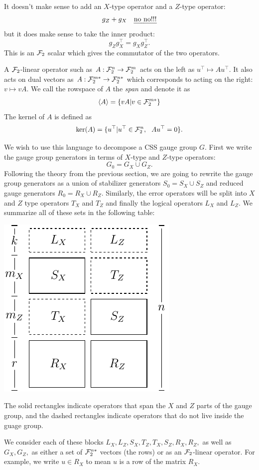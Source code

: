 It doesn't make sense to add an $X$-type operator and
a $Z$-type operator:
$$
    g_Z + g_X \ \ \ \mbox{\emph{no no!!!}}
$$
but it does make sense to take the inner product:
$$
    g_Z g_X^\top = g_X g_Z^\top.
$$
This is an $\mathcal{F}_2$ scalar which gives the commutator of the 
two operators.

A $\mathcal{F}_2$-linear operator such as
$ A : \mathcal{F}_2^n \to \mathcal{F}_2^m $
acts on the left as $ u^\top \mapsto A u^\top.$
It also acts on dual vectors as
$ A : \mathcal{F}_2^{m*} \to \mathcal{F}_2^{n*} $
which corresponds to acting on the right: $v \mapsto vA.$ 
We call the rowspace of 
$A$ the \emph{span} and denote 
it as 
$$\langle A \rangle = \{ vA | v \in \mathcal{F}_2^{m*} \}$$
The kernel of $A$ is defined as
$$
    \mathrm{ker}(A) = \{ u^\top | u^\top \in \mathcal{F}_2^n,\ \  A u^\top = 0 \}.
$$

We wish to use this language to decompose a CSS gauge group $G.$
First we write the gauge group generators in terms of
$X$-type and $Z$-type operators:
$$
    G_0 = G_X \cup G_Z.
$$
Following the theory from the previous section,
we are going to rewrite the gauge group generators
as a union of stabilizer generators $S_0 = S_X \cup S_Z$
and reduced gauge generators $R_0 = R_X \cup R_Z.$
Similarly, the error operators
will be split into $X$ and $Z$ type
operators $T_X$ and $T_Z$ and
finally the logical operators
$L_X$ and $L_Z.$
We summarize all of these sets
in the following table:
\begin{center}
\includegraphics[]{pic-symplectic.pdf}
\end{center}
The solid rectangles indicate operators that
span the $X$ and $Z$ parts of the gauge group,
and the dashed rectangles indicate operators that
do not live inside the guage group.

We consider each of these blocks 
$L_X, L_Z, S_X, T_Z, T_X, S_Z, R_X, R_Z,$
as well as $G_X,G_Z,$
as either a set of $\mathcal{F}_2^{n*}$ vectors (the rows) or as an 
$\mathcal{F}_2$-linear operator.
For example, we write $u\in R_X$ to mean $u$ is 
a row of the matrix $R_X$.

